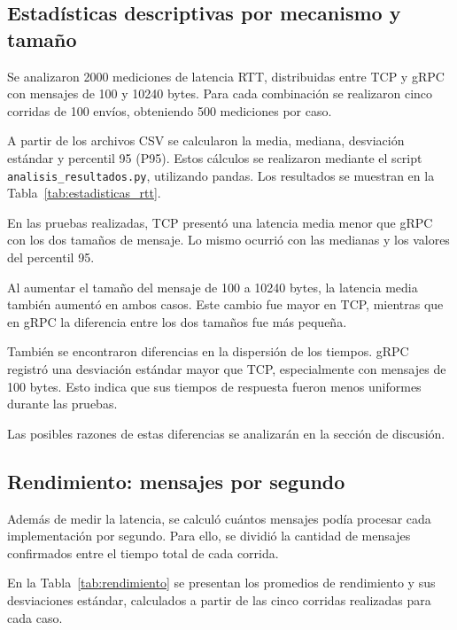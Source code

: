 

\subsection{Estadísticas descriptivas por mecanismo y tamaño}

Se analizaron 2000 mediciones de latencia RTT, distribuidas
entre TCP y gRPC con mensajes de 100 y 10240 bytes.
Para cada combinación se realizaron cinco corridas
de 100 envíos, obteniendo 500 mediciones por caso.

A partir de los archivos CSV se calcularon la media,
mediana, desviación estándar y percentil 95 (P95).
Estos cálculos se realizaron mediante el script
\texttt{analisis\_resultados.py}, utilizando pandas.
Los resultados se muestran en la
Tabla~\ref{tab:estadisticas_rtt}.



En las pruebas realizadas, TCP presentó una latencia
media menor que gRPC con los dos tamaños de mensaje.
Lo mismo ocurrió con las medianas y los valores del
percentil 95.

Al aumentar el tamaño del mensaje de 100 a 10240 bytes,
la latencia media también aumentó en ambos casos.
Este cambio fue mayor en TCP, mientras que en gRPC
la diferencia entre los dos tamaños fue más pequeña.

También se encontraron diferencias en la dispersión
de los tiempos. gRPC registró una desviación estándar
mayor que TCP, especialmente con mensajes de 100 bytes.
Esto indica que sus tiempos de respuesta fueron menos
uniformes durante las pruebas.

Las posibles razones de estas diferencias se
analizarán en la sección de discusión.

\subsection{Rendimiento: mensajes por segundo}

Además de medir la latencia, se calculó cuántos mensajes
podía procesar cada implementación por segundo.
Para ello, se dividió la cantidad de mensajes
confirmados entre el tiempo total de cada corrida.

En la Tabla~\ref{tab:rendimiento} se presentan
los promedios de rendimiento y sus desviaciones
estándar, calculados a partir de las cinco
corridas realizadas para cada caso.




